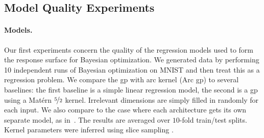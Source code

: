 \documentclass{article}
\newcommand{\note}[1]{}
\newcommand{\gp}{{\sc gp}}
\newcommand{\agp}{Arc \gp}
\begin{document}
\subsection{Model Quality Experiments}   

\paragraph{Models.}

Our first experiments concern the quality of the regression models used to form the response surface for Bayesian optimization. We generated data by performing 10 independent runs of Bayesian optimization on MNIST and then treat this as a regression problem. We compare the \gp{} with arc kernel (\agp) to several baselines: the first baseline is a simple linear regression model, the second is a \gp{} using a Mat\'{e}rn $\nicefrac{5}{2}$ kernel. Irrelevant dimensions are simply filled in randomly for each input. We also compare to the case where each architecture gets its own separate model, as in~\cite{bergstra2011algorithms}. The results are averaged over $10$-fold train/test splits. Kernel parameters were inferred using slice sampling \cite{neal2003slice}.

%
%

\end{document}
